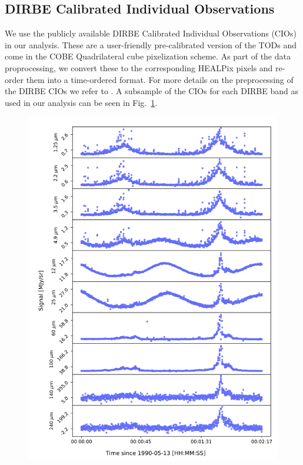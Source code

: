 \documentclass[twocolumn]{aa}
\begin{document}
\subsection{DIRBE Calibrated Individual Observations}
We use the publicly available DIRBE Calibrated Individual Observations (CIOs)
in our analysis. These are a user-friendly pre-calibrated version of the TODs
and come in the COBE Quadrilateral cube pixelization scheme. As part of the data proprocessing,
we convert these to the corresponding HEALPix pixels and re-order them into a time-ordered format.
For more details on the preprocessing of the DIRBE CIOs we refer to \cite{CG02_01}.
A subsample of the CIOs for each DIRBE band as used in our analysis can be seen in Fig.~\ref{fig:tod_zodi}.
\begin{figure}
    \centering
    \includegraphics[width=\columnwidth]{figs/tod_zodi.pdf}
    \caption{}
    \label{fig:tod_zodi}
\end{figure}
    
\end{document}
